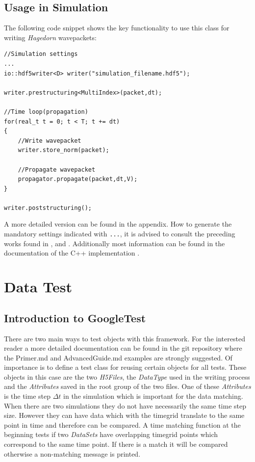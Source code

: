 \section{Usage in Simulation}
The following code snippet shows the key functionality to use this class for writing \textit{Hagedorn} wavepackets:

\begin{lstlisting}
//Simulation settings
...
io::hdf5writer<D> writer("simulation_filename.hdf5");

writer.prestructuring<MultiIndex>(packet,dt);

//Time loop(propagation)
for(real_t t = 0; t < T; t += dt)
{
	//Write wavepacket
	writer.store_norm(packet);
	
	//Propagate wavepacket
   	propagator.propagate(packet,dt,V);
}

writer.poststructuring();
\end{lstlisting}
A more detailed version can be found in the appendix. How to generate the mandatory settings indicated with \texttt{...}, it is advised to consult the preceding works found in \cite{bt_michajab}, \cite{st_benedekv} and \cite{bt_lionelm}. Additionally most information can be found in the documentation of the C++ implementation \cite{libwaveblocks}.

\chapter{Data Test}

\section{Introduction to GoogleTest}
There are two main ways to test objects with this framework. For the interested reader a more detailed documentation can be found in the git repository \cite{googletestdoc} where the Primer.md and AdvancedGuide.md examples are strongly suggested. Of importance is to define a test class for reusing certain objects for all tests. These objects in this case are the two \textit{H5Files}, the \textit{DataType} used in the writing process and the \textit{Attributes} saved in the root group of the two files. One of these \textit{Attributes} is the time step $\Delta t$ in the simulation which is important for the data matching. When there are two simulations they do not have necessarily the same time step size. However they can have data which with the timegrid translate to the same point in time and therefore can be compared. A time matching function at the beginning tests if two \textit{DataSets} have overlapping timegrid points which correspond to the same time point. If there is a match it will be compared otherwise a non-matching message is printed.  

